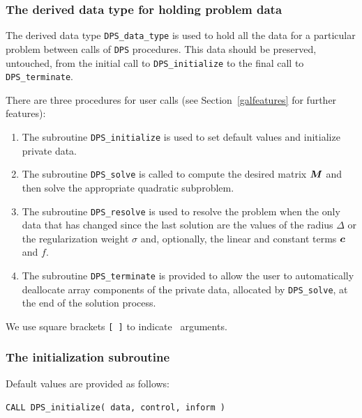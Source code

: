 \documentclass{galahad}
\newcommand{\packagename}{DPS}
\begin{document}

\subsubsection{The derived data type for holding problem data}\label{typedata}
The derived data type
{\tt \packagename\_data\_type}
is used to hold all the data for a particular problem between calls of
{\tt \packagename} procedures.
This data should be preserved, untouched, from the initial call to
{\tt \packagename\_initialize}
to the final call to
{\tt \packagename\_terminate}.


\galarguments
There are three procedures for user calls
(see Section~\ref{galfeatures} for further features):

\begin{enumerate}
\item The subroutine
      {\tt \packagename\_initialize}
      is used to set default values and initialize private data.
\item The subroutine
      {\tt \packagename\_solve}
      is called to compute the desired matrix ${\bm{M}}$ and then solve the
      appropriate quadratic subproblem.
\item The subroutine
      {\tt \packagename\_resolve}
      is used to resolve the problem when
      the only data that has changed since the last solution are the
      values of the radius $\Delta$ or the regularization weight $\sigma$
      and, optionally, the linear and constant terms ${\bm{c}}$ and $f$.
\item The subroutine
      {\tt \packagename\_terminate}
      is provided to allow the user to automatically deallocate array
       components of the private data, allocated by
       {\tt \packagename\_solve},
       at the end of the solution process.
\end{enumerate}
We use square brackets {\tt [ ]} to indicate \optional\ arguments.


\subsubsection{The initialization subroutine}\label{subinit}
 Default values are provided as follows:

\hskip0.5in
{\tt CALL \packagename\_initialize( data, control, inform )}
\end{document}
